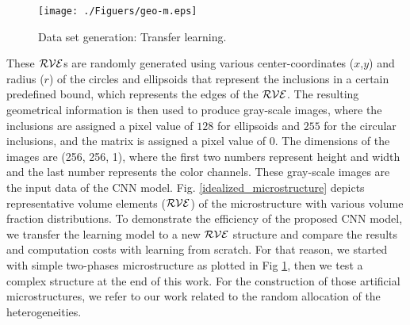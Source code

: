 \documentclass[final,3p,times]{elsarticle}
\begin{document}
\begin{figure}[t]
	\centering 
	\texttt{[image: ./Figuers/geo-m.eps]} 
	\caption{Data set generation: Transfer learning.}
	\label{TL_RVEs}
\end{figure}

These $\cal{RVE}$s are randomly generated using various center-coordinates ($x$,$y$) and radius ($r$) of the circles and ellipsoids that represent the inclusions in a certain predefined bound, which represents the edges of the $\cal{RVE}$. The resulting geometrical information is then used to produce gray-scale images, where the inclusions are assigned a pixel value of $128$ for ellipsoids and $255$ for the circular inclusions, and the matrix is assigned a pixel value of $0$. The dimensions of the images are (256, 256, 1), where the first two numbers represent height and width and the last number represents the color channels. These gray-scale images are the input data of the CNN model. Fig. \ref{idealized_microstructure} depicts representative volume elements ($\cal{RVE}$) of the microstructure with various volume fraction distributions. To demonstrate the efficiency of the proposed CNN model, we transfer the learning model to a new $\cal{RVE}$ structure and compare the results and computation costs with learning from scratch. For that reason, we started with simple two-phases microstructure as plotted in Fig \ref{TL_RVEs}, then we test a complex structure at the end of this work. For the construction of those artificial microstructures, we refer to our work \cite{noii2022probabilistic} related to the random allocation of the heterogeneities.
\end{document}
